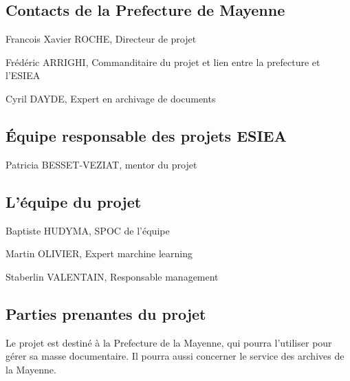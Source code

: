 
\subsection{Contacts de la Prefecture de Mayenne}
Francois Xavier ROCHE, Directeur de projet

Frédéric ARRIGHI, Commanditaire du projet et lien entre la prefecture et l'ESIEA

Cyril DAYDE, Expert en archivage de documents



\subsection{Équipe responsable des projets ESIEA}
Patricia BESSET-VEZIAT, mentor du projet



\subsection{L'équipe du projet}
Baptiste HUDYMA, SPOC de l'équipe

Martin OLIVIER, Expert marchine learning

Staberlin VALENTAIN, Responsable management


\subsection{Parties prenantes du projet}
Le projet est destiné à la Prefecture de la Mayenne, qui pourra l'utiliser pour gérer sa masse documentaire.
Il pourra aussi concerner le service des archives de la Mayenne.

